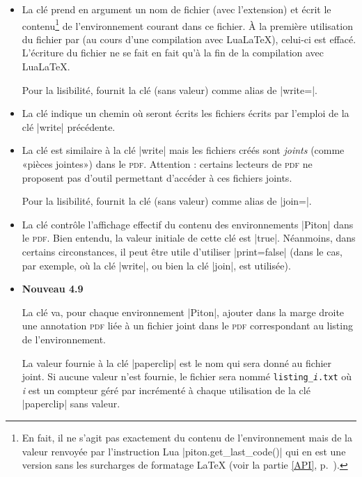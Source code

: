 \documentclass[dvipsnames,svgnames]{article}
\begin{document}
\begin{itemize}
\item {} La clé  prend en argument un nom de
fichier (avec l'extension) et écrit le contenu\footnote{En fait, il ne s'agit
  pas exactement du contenu de l'environnement mais de la valeur renvoyée par
  l'instruction Lua |piton.get_last_code()| qui en est une version sans les
  surcharges de formatage LaTeX (voir la partie \ref{API}, p.~\pageref{API}).}
de l'environnement courant dans ce fichier. À la première utilisation du fichier
par  (au cours d'une compilation avec LuaLaTeX), celui-ci est effacé.
L'écriture du fichier ne se fait en fait qu'à la fin de la compilation avec LuaLaTeX.

Pour la lisibilité,  fournit la clé  (sans valeur) comme
alias de |write=|.

\item {} La clé  indique un chemin où
seront écrits les fichiers écrits par l'emploi de la clé |write| précédente.

\item {} 
La clé  est similaire à la clé |write| mais les fichiers créés sont
\emph{joints} (comme «pièces jointes») dans le \textsc{pdf}. Attention :
certains lecteurs de \textsc{pdf} ne proposent pas d'outil permettant d'accéder à
ces fichiers joints.


Pour la lisibilité,  fournit la clé  (sans valeur) comme
alias de |join=|.


\item {}
La clé  contrôle l'affichage effectif du contenu des
environnements |{Piton}| dans le \textsc{pdf}. Bien entendu, la valeur initiale de cette
clé est |true|. Néanmoins, dans certains circonstances, il peut être utile
d'utiliser |print=false| (dans le cas, par exemple, où la clé |write|, ou bien
la clé |join|, est utilisée).

\item {}
\colorbox{yellow!50}{\textbf{Nouveau 4.9}}

\nobreak
La clé  va, pour chaque environnement |{Piton}|, ajouter dans la marge
droite une annotation \textsc{pdf} liée à un fichier joint dans le \textsc{pdf} correspondant
au listing de l'environnement.

La valeur fournie à la clé |paperclip| est le nom qui sera donné au fichier joint. Si aucune
valeur n'est fournie, le fichier sera nommé \texttt{listing_\textsl{i}.txt} où \textsl{i}
est un compteur géré par  incrémenté à chaque utilisation de la clé |paperclip|
sans valeur.


\end{itemize}
\end{document}
